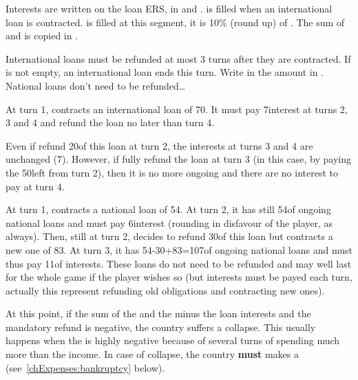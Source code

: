 \aparag Interests are written on the loan ERS, in  and .
\bparag {} is filled when an
international loan is contracted.
\bparag {} is filled at this segment, it
is 10\% (round up) of .
\bparag The sum of  and
 is copied in .

 International loans must be refunded at most 3 turns
after they are contracted. If  is not
empty, an international loan ends this turn. Write in  the amount in .
\bparag National loans don't need to be refunded\ldots

\begin{exemple}
  At turn 1, \POR contracts an international loan of 70\ducats. It must pay
  7\ducats interest at turns 2, 3 and 4 and refund the loan no later than turn
  4.

  Even if \POR refund 20\ducats of this loan at turn 2, the interests at turns
  3 and 4 are unchanged (7\ducats). However, if \POR fully refund the loan at
  turn 3 (in this case, by paying the 50\ducats left from turn 2), then it is
  no more ongoing and there are no interest to pay at turn 4.

  \smallskip

  At turn 1, \FRA contracts a national loan of 54\ducats. At turn 2, it has
  still 54\ducats of ongoing national loans and must pay 6\ducats interest
  (rounding in disfavour of the player, as always). Then, still at turn 2,
  \FRA decides to refund 30\ducats of this loan but contracts a new one of
  83\ducats. At turn 3, it has 54-30+83=107\ducats of ongoing national loans
  and must thus pay 11\ducats of interests. These loans do not need to be
  refunded and may well last for the whole game if the player wishes so (but
  interests must be payed each turn, actually this represent refunding old
  obligations and contracting new ones).
\end{exemple}

 At this point, if the sum of the \RT and the
 minus the loan interests and the mandatory refund is
negative, the country suffers a collapse. This usually happens when the \RT is
highly negative because of several turns of spending much more than the
income.
\bparag In case of collapse, the country \textbf{must} makes a  (see~\ref{chExpenses:bankruptcy} below).



